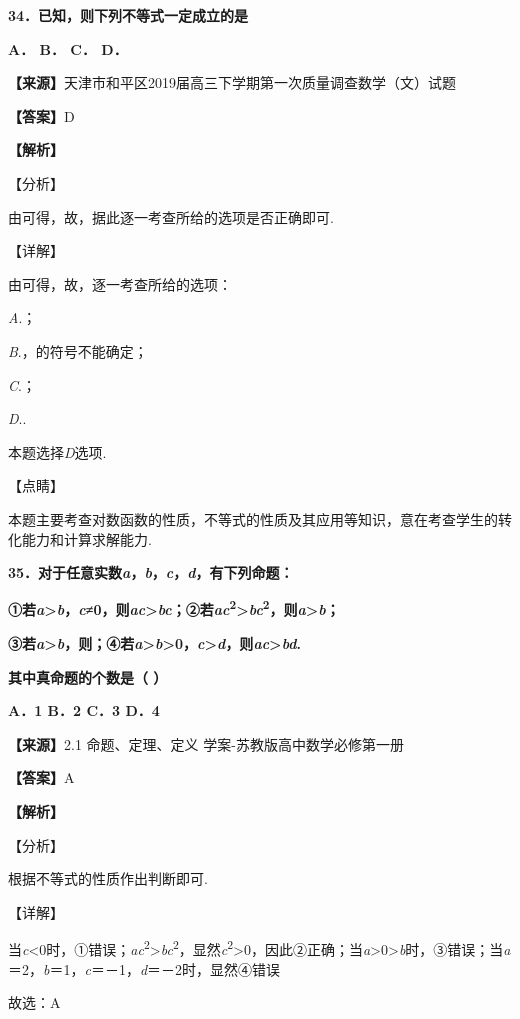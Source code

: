 \documentclass[
]{article}
\begin{document}
\textbf{34．已知，则下列不等式一定成立的是}

\textbf{A． B． C． D．}

\textbf{【来源】}天津市和平区2019届高三下学期第一次质量调查数学（文）试题

\textbf{【答案】}D

\textbf{【解析】}

【分析】

由可得，故，据此逐一考查所给的选项是否正确即可.

【详解】

由可得，故，逐一考查所给的选项：

\emph{A}.；

\emph{B}.，的符号不能确定；

\emph{C}.；

\emph{D}..

本题选择\emph{D}选项.

【点睛】

本题主要考查对数函数的性质，不等式的性质及其应用等知识，意在考查学生的转化能力和计算求解能力.

\textbf{35．对于任意实数\emph{a}，\emph{b}，\emph{c}，\emph{d}，有下列命题：}

\textbf{①若\emph{a}\textgreater{}\emph{b}，\emph{c}≠0，则\emph{ac}\textgreater{}\emph{bc}；②若\emph{ac}\textsuperscript{2}\textgreater{}\emph{bc}\textsuperscript{2}，则\emph{a}\textgreater{}\emph{b}；}

\textbf{③若\emph{a}\textgreater{}\emph{b}，则；④若\emph{a}\textgreater{}\emph{b}\textgreater0，\emph{c}\textgreater{}\emph{d}，则\emph{ac}\textgreater{}\emph{bd}.}

\textbf{其中真命题的个数是（ ）}

\textbf{A．1 B．2 C．3 D．4}

\textbf{【来源】}2.1 命题、定理、定义 学案-苏教版高中数学必修第一册

\textbf{【答案】}A

\textbf{【解析】}

【分析】

根据不等式的性质作出判断即可.

【详解】

当\emph{c}\textless0时，①错误；\emph{ac}\textsuperscript{2}\textgreater{}\emph{bc}\textsuperscript{2}，显然\emph{c}\textsuperscript{2}\textgreater0，因此②正确；当\emph{a}\textgreater0\textgreater{}\emph{b}时，③错误；当\emph{a}＝2，\emph{b}＝1，\emph{c}＝－1，\emph{d}＝－2时，显然④错误

故选：A
\end{document}
